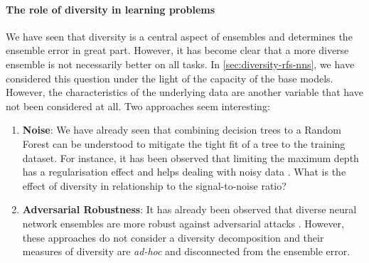 \documentclass[
	twoside=false, %
]{kaobook}
\begin{document}
\paragraph{The role of diversity in learning problems} We have seen that diversity is a central aspect of ensembles and determines the ensemble error in great part. However, it has become clear that a more diverse ensemble is not necessarily better on all tasks. In \cref{sec:diversity-rfs-nns}, we have considered this question under the light of the capacity of the base models. However, the characteristics of the underlying data are another variable that have not been considered at all. Two approaches seem interesting:
\begin{enumerate}
\item \textbf{Noise}: We have already seen that combining decision trees to a Random Forest can be understood to mitigate the tight fit of a tree to the training dataset. For instance, it has been observed that limiting the maximum depth has a regularisation effect and helps dealing with noisy data \cite{zhou_TreesForestsChickens_2023}. What is the effect of diversity in relationship to the signal-to-noise ratio?
\item \textbf{Adversarial Robustness}: It has already been observed that diverse neural network ensembles are more robust against adversarial attacks \cite{pang_ImprovingAdversarialRobustness_2019,amada_AdversarialRobustnessFace_}. However, these approaches do not consider a diversity decomposition and their measures of diversity are \textit{ad-hoc} and disconnected from the ensemble error.
\end{enumerate}
\end{document}
